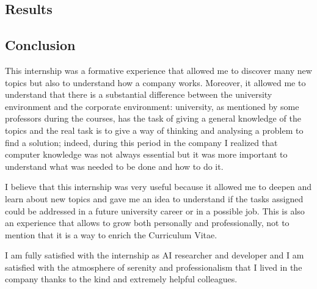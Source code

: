 \documentclass[14pt]{extarticle}
\def\sp{\vspace{5pt}}
\def\ss{\vspace{25pt}}
\def\ppn{\vspace{10pt}}
\begin{document}
\newpage
\begin{center}
	\section{Results}
	\sp
\end{center}
\begin{flushleft}
\end{flushleft}

\newpage
\begin{center}
	\section{Conclusion}
	\sp
\end{center}
\begin{flushleft}

This internship was a formative experience that allowed me to discover many new topics but also to understand how a company works. Moreover, it allowed me to understand that there is a substantial difference between the university environment and the corporate environment: university, as mentioned by some professors during the courses, has the task of giving a general knowledge of the topics and the real task is to give a way of thinking and analysing a problem to find a solution; indeed, during this period in the company I realized that computer knowledge was not always essential but it was more important to understand what was needed to be done and how to do it.
\ppn

I believe that this internship was very useful because it allowed me to deepen and learn about new topics and gave me an idea to understand if the tasks assigned could be addressed in a future university career or in a possible job.
\newline
This is also an experience that allows to grow both personally and professionally, not to mention that it is a way to
enrich the Curriculum Vitae.

\ppn
I am fully satisfied with the internship as AI researcher and developer and I am satisfied with the atmosphere of serenity and professionalism that I lived in the company thanks to the kind and extremely helpful colleagues.
	\ss
\end{flushleft}

\newpage
\end{document}
